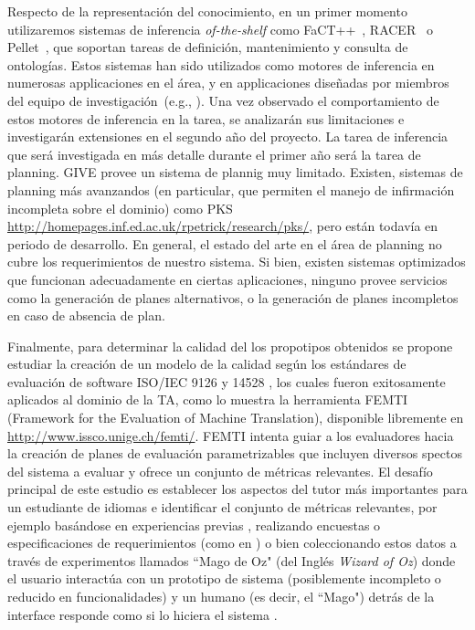Respecto de la representaci\'on del conocimiento, en un primer momento
utilizaremos sistemas de inferencia \emph{of-the-shelf} como
FaCT++~\citep{horr:fact99},
RACER~\citep{haar:race99} o Pellet~\citep{siri:pell06}, que soportan tareas de
definici\'on, mantenimiento y consulta de ontolog\'ias.  Estos sistemas
han sido utilizados como motores de inferencia
en numerosas applicaciones en el \'area, y en applicaciones
dise\~nadas por miembros del equipo de
investigaci\'on~(e.g., \citep{benotti07}).  Una vez observado el comportamiento de
estos motores de inferencia en la tarea, se analizar\'an sus limitaciones
e investigar\'an extensiones en el segundo a\~no del proyecto.  La tarea
de inferencia que ser\'a investigada en m\'as detalle durante el primer
a\~no ser\'a la tarea de planning.  GIVE provee un sistema de plannig muy
limitado.  Existen, sistemas de planning m\'as avanzandos (en particular,
que permiten el manejo de infirmaci\'on incompleta sobre el dominio)
como PKS \url{http://homepages.inf.ed.ac.uk/rpetrick/research/pks/}, pero
est\'an todav\'ia en periodo de desarrollo.  En general, el estado del
arte en el \'area de planning no cubre los requerimientos de nuestro
sistema.  Si bien, existen sistemas optimizados que funcionan adecuadamente
en ciertas aplicaciones, ninguno provee servicios como la generaci\'on de
planes alternativos, o la generaci\'on de planes incompletos en caso de
absencia de plan.

Finalmente, para determinar la calidad del los propotipos obtenidos se propone estudiar la creaci\'on de un modelo de la calidad seg\'un los est\'andares de evaluaci\'on de software ISO/IEC 9126 y 14528 \citep{ISO9126-1, ISO14598-1}, los cuales fueron exitosamente aplicados al dominio de la TA, como lo muestra la herramienta FEMTI (Framework for the Evaluation of Machine Translation), disponible libremente en \url{http://www.issco.unige.ch/femti/}. FEMTI \citep{Est2005} intenta guiar a los evaluadores hacia la creaci\'on de planes de evaluaci\'on parametrizables que incluyen diversos spectos del sistema a evaluar y ofrece un conjunto de m\'etricas relevantes. El desaf\'io principal de este estudio es establecer los aspectos del tutor m\'as importantes para un estudiante de idiomas e identificar el conjunto de m\'etricas relevantes, por ejemplo bas\'andose en experiencias previas \citep{paradise06, Chu2000, Litman2002}, realizando encuestas o especificaciones de requerimientos (como en \citep{Lecoeuche98}) o bien coleccionando estos datos a trav\'es de experimentos llamados ``Mago de Oz" (del Ingl\'es \textit{Wizard of Oz}) donde el usuario interact\'ua con un prototipo de sistema (posiblemente incompleto o reducido en funcionalidades) y un humano (es decir, el ``Mago") detr\'as de la interface responde como si lo hiciera el sistema \citep{Dahlback93, Fabbrizio05}.

